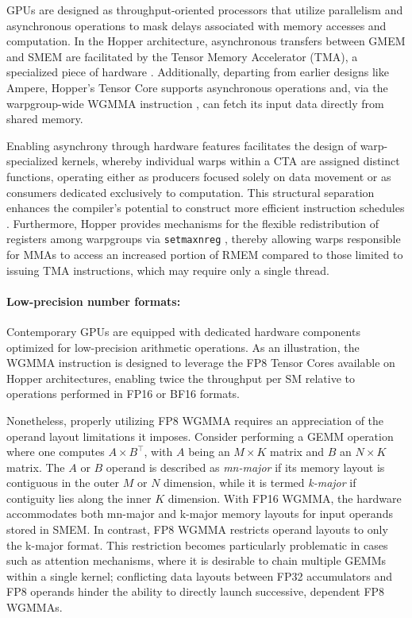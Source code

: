 \begin{enumerate}
GPUs are designed as throughput-oriented processors that utilize parallelism and asynchronous operations to mask delays associated with memory accesses and computation. In the Hopper architecture, asynchronous transfers between GMEM and SMEM are facilitated by the Tensor Memory Accelerator (TMA), a specialized piece of hardware \cite[\S7.29]{cuda}. Additionally, departing from earlier designs like Ampere, Hopper’s Tensor Core supports asynchronous operations and, via the warpgroup-wide WGMMA instruction \cite[\S9.7.14]{ptx}, can fetch its input data directly from shared memory.

Enabling asynchrony through hardware features facilitates the design of warp-specialized kernels, whereby individual warps within a CTA are assigned distinct functions, operating either as producers focused solely on data movement or as consumers dedicated exclusively to computation. This structural separation enhances the compiler's potential to construct more efficient instruction schedules \citep{warp-specialization-2011}. Furthermore, Hopper provides mechanisms for the flexible redistribution of registers among warpgroups via \verb|setmaxnreg| \cite[\S9.7.17.1]{ptx}, thereby allowing warps responsible for MMAs to access an increased portion of RMEM compared to those limited to issuing TMA instructions, which may require only a single thread.

\paragraph{Low-precision number formats:}
\label{sec:low-precision-gpu}
Contemporary GPUs are equipped with dedicated hardware components optimized for low-precision arithmetic operations. As an illustration, the WGMMA instruction is designed to leverage the FP8 Tensor Cores available on Hopper architectures, enabling twice the throughput per SM relative to operations performed in FP16 or BF16 formats.

Nonetheless, properly utilizing FP8 WGMMA requires an appreciation of the operand layout limitations it imposes. Consider performing a GEMM operation where one computes $A \times B^{\top}$, with $A$ being an $M \times K$ matrix and $B$ an $N \times K$ matrix. The $A$ or $B$ operand is described as \emph{mn-major} if its memory layout is contiguous in the outer $M$ or $N$ dimension, while it is termed \emph{k-major} if contiguity lies along the inner $K$ dimension. With FP16 WGMMA, the hardware accommodates both mn-major and k-major memory layouts for input operands stored in SMEM. In contrast, FP8 WGMMA restricts operand layouts to only the k-major format. This restriction becomes particularly problematic in cases such as attention mechanisms, where it is desirable to chain multiple GEMMs within a single kernel; conflicting data layouts between FP32 accumulators and FP8 operands hinder the ability to directly launch successive, dependent FP8 WGMMAs.


\end{enumerate}
